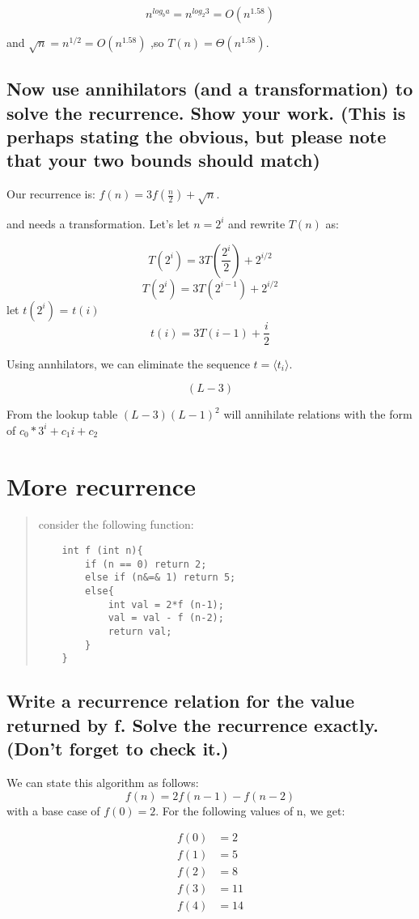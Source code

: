 \documentclass[titlepage]{article}\usepackage[]{graphicx}\usepackage[]{color}
\begin{document}
\[ n^{log_b a} = n^{log_2 3} = O(n^{1.58}) \]

and $\sqrt{n} = n^{1/2} = O(n^{1.58})$ ,so $T(n) = \Theta(n^{1.58})$.

\subsection{Now use annihilators (and a transformation) to solve the recurrence. Show
your work. (This is perhaps stating the obvious, but please note that your two
bounds should match)}
Our recurrence is: $f(n) = 3f(\frac{n}{2}) + \sqrt{n}$. 


and needs a transformation. Let's  let $n = 2^i$ and rewrite $T(n)$ as:

\[ T(2^i) = 3T(\frac{2^i}{2}) + 2^{i/2} \]
\[ T(2^i) = 3T(2^{i-1}) + 2^{i/2} \]
let $t(2^i)$ = $t(i)$
\[ t(i) = 3T(i-1) + \frac{i}{2} \]

Using annhilators, we can eliminate the sequence $ t = \langle t_i \rangle $. 

\[ (L-3)   \]

From the lookup table $(L-3) (L-1)^2$ will annihilate relations with the form
of $c_0*3^i + c_1i + c_2$

\section{More recurrence}

\begin{quote}
consider the following function:
\begin{lstlisting}
	int f (int n){
		if (n == 0) return 2;
		else if (n&=& 1) return 5;
		else{
			int val = 2*f (n-1);
			val = val - f (n-2);
			return val;
		}
	}
\end{lstlisting}
\end{quote}

\subsection{Write a recurrence relation for the value returned by f. Solve the
recurrence exactly. (Don't forget to check it.)}
We can state this algorithm as follows:
\[ f(n) = 2f(n-1) - f(n-2) \]
with a base case of $f(0) = 2$. For the following values of n, we get:

\begin{align}
	f(0) &= 2 \\
	f(1) &= 5 \\
	f(2) &= 8 \\
	f(3) &= 11 \\
	f(4) &= 14
	\label{eqn:something}
\end{align}
\end{document}
